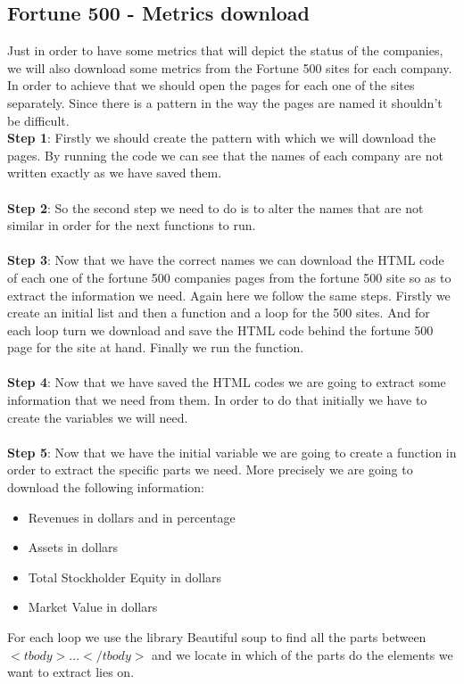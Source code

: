 \documentclass{book}
\begin{document}
\subsection{Fortune 500 - Metrics download}
Just in order to have some metrics that will depict the status of the companies, we will also download some metrics from the Fortune 500 sites for each company.\cite{key35} In order to achieve that we should open the pages for each one of the sites separately. Since there is a pattern in the way the pages are named it shouldn't be difficult.\\
\textbf{Step 1}: Firstly we should create the pattern with which we will download the pages. By running the code we can see that the names of each company are not written exactly as we have saved them.\\\\
\textbf{Step 2}: So the second step we need to do is to alter the names that are not similar in order for the next functions to run.\\\\
\textbf{Step 3}: Now that we have the correct names we can download the HTML code of each one of the fortune 500 companies pages from the fortune 500 site so as to extract the information we need. Again here we follow the same steps. Firstly we create an initial list and then a function and a loop for the 500 sites. And for each loop turn we download and save the HTML code behind the fortune 500 page for the site at hand. Finally we run the function.\\\\
\textbf{Step 4}: Now that we have saved the HTML codes we are going to extract some information that we need from them. In order to do that initially we have to create the variables we will need.\\\\
\textbf{Step 5}: Now that we have the initial variable we are going to create a function in order to extract the specific parts we need. More precisely we are going to download the following information:
\begin{itemize}
\item Revenues in dollars and in percentage
\item Assets in dollars
\item Total Stockholder Equity in dollars
\item Market Value in dollars
\end{itemize}
For each loop we use the library Beautiful soup to find all the parts between $<tbody>...</tbody>$ and we locate in which of the parts do the elements we want to extract lies on.\\\\
\end{document}
